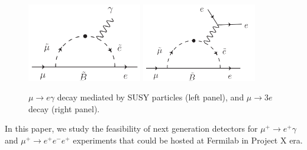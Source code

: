 \begin{figure}[htbp]
\begin{center}
\includegraphics[width=5cm]{Figures/mu_e_gamma_diagram.pdf} \hspace*{2cm}
\includegraphics[width=5cm]{Figures/mu_3e_diagram.pdf}
\caption{\label{CL:mutoegamma}$\mu \rightarrow e\gamma$ decay mediated by SUSY particles (left panel), and $\mu \rightarrow 3e$ decay (right panel).}
\end{center}
\end{figure}


In this paper, we study the feasibility of next generation detectors for
$\mu^+\to e^+\gamma$ and $\mu^+\to e^+e^-e^+$ experiments that could be
hosted at Fermilab in Project X era.



